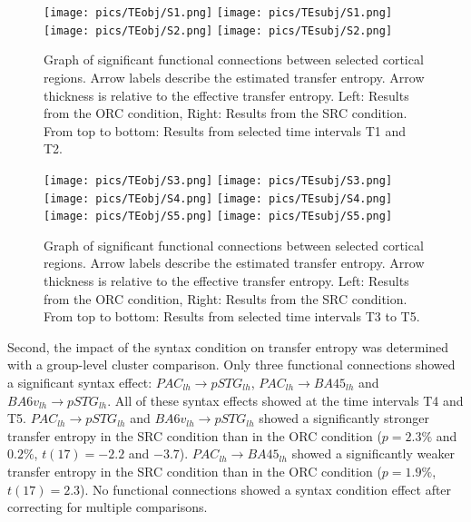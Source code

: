 \vspace{5mm}


\begin{figure}[h]
\begin{center}
\vspace{7mm}
\texttt{[image: pics/TEobj/S1.png]}
\texttt{[image: pics/TEsubj/S1.png]}
\texttt{[image: pics/TEobj/S2.png]}
\texttt{[image: pics/TEsubj/S2.png]}
\caption{\label{4.4.networkgraph.a} Graph of significant functional connections between selected cortical regions. Arrow labels describe the estimated transfer entropy. Arrow thickness is relative to the effective transfer entropy. Left: Results from the ORC condition, Right: Results from the SRC condition. From top to bottom: Results from selected time intervals T1 and T2.}
\end{center}
\end{figure}

\begin{figure}[h]
\begin{center}
\vspace{7mm}
\texttt{[image: pics/TEobj/S3.png]}
\texttt{[image: pics/TEsubj/S3.png]}
\texttt{[image: pics/TEobj/S4.png]}
\texttt{[image: pics/TEsubj/S4.png]}
\texttt{[image: pics/TEobj/S5.png]}
\texttt{[image: pics/TEsubj/S5.png]}
\caption{\label{4.4.networkgraph.b} Graph of significant functional connections between selected cortical regions. Arrow labels describe the estimated transfer entropy. Arrow thickness is relative to the effective transfer entropy. Left: Results from the ORC condition, Right: Results from the SRC condition. From top to bottom: Results from selected time intervals T3 to T5.}
\end{center}
\end{figure}


Second, the impact of the syntax condition on transfer entropy was determined with a group-level cluster comparison.
Only three functional connections showed a significant syntax effect: $PAC_{lh} \rightarrow pSTG_{lh}$, $PAC_{lh} \rightarrow BA45_{lh}$ and $BA6v_{lh} \rightarrow pSTG_{lh}$.
All of these syntax effects showed at the time intervals T4 and T5.
$PAC_{lh} \rightarrow pSTG_{lh}$ and $BA6v_{lh} \rightarrow pSTG_{lh}$ showed a significantly stronger transfer entropy in the SRC condition than in the ORC condition ($p = 2.3\%$ and $0.2\%$, $t(17) = -2.2$ and $-3.7$).
$PAC_{lh} \rightarrow BA45_{lh}$ showed a significantly weaker transfer entropy in the SRC condition than in the ORC condition ($p = 1.9\%$, $t(17) = 2.3$).
No functional connections showed a syntax condition effect after correcting for multiple comparisons.